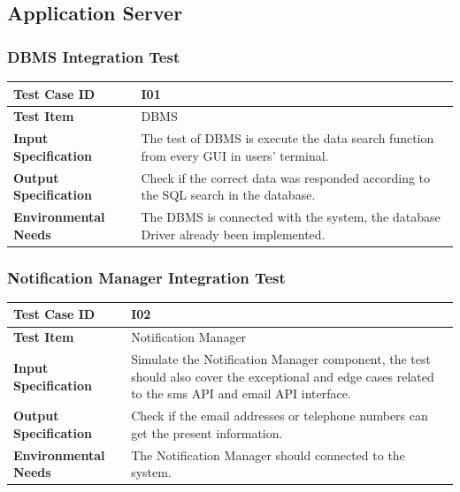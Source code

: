 \documentclass[a4paper,11pt]{article}
\begin{document}
	\subsection{Application Server}
		\subsubsection{DBMS Integration Test}
\begin{table}[H] 
\begin{center}
\renewcommand\arraystretch{1.5}
\begin{tabular}{|p{5cm}|p{7cm}|}
 \hline
\textbf{Test Case ID}& I01\\
 \hline
\textbf{Test Item}&DBMS\\
 \hline
\textbf{Input Specification}&The test of DBMS is execute the data search function from every GUI in users' terminal.\\
 \hline
\textbf{Output Specification}&Check if the correct data was responded according to the SQL search in the database.\\
 \hline
 \textbf{Environmental Needs}&The DBMS is connected with the system, the database Driver already been implemented.\\
 \hline
\end{tabular}
\end{center}
\end{table}		
		\subsubsection{Notification Manager Integration Test}
\begin{table}[H] 
\begin{center}
\renewcommand\arraystretch{1.5}
\begin{tabular}{|p{5cm}|p{7cm}|}
 \hline
\textbf{Test Case ID}& I02\\
 \hline
\textbf{Test Item}&Notification Manager\\
 \hline
\textbf{Input Specification}&Simulate the Notification Manager component, the test should also cover the exceptional and edge cases related to the sms API and email API interface.\\
 \hline
\textbf{Output Specification}&Check if the email addresses or telephone numbers can get the present information.\\
 \hline
 \textbf{Environmental Needs}&The Notification Manager should connected to the system.\\
 \hline
\end{tabular}
\end{center}
\end{table}		
\end{document}
